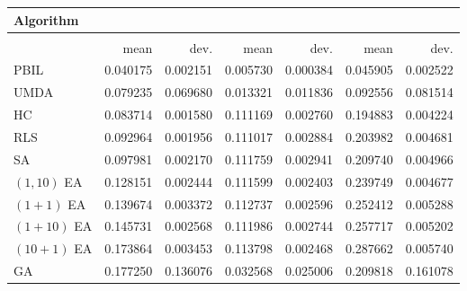 \begin{tabular}{@{} l *{6}{>{{}}N{1}{2}} @{}}
\toprule
{Algorithm} &  \\
\midrule
&  &  &  \\
\midrule
& {mean} & {dev.} & {mean} & {dev.} & {mean} & {dev.} \\
\midrule
PBIL & 0.040175 & 0.002151 & 0.005730 & 0.000384 & 0.045905 & 0.002522 \\
UMDA & 0.079235 & 0.069680 & 0.013321 & 0.011836 & 0.092556 & 0.081514 \\
HC & 0.083714 & 0.001580 & 0.111169 & 0.002760 & 0.194883 & 0.004224 \\
RLS & 0.092964 & 0.001956 & 0.111017 & 0.002884 & 0.203982 & 0.004681 \\
SA & 0.097981 & 0.002170 & 0.111759 & 0.002941 & 0.209740 & 0.004966 \\
$(1,10)$ EA & 0.128151 & 0.002444 & 0.111599 & 0.002403 & 0.239749 & 0.004677 \\
$(1+1)$ EA & 0.139674 & 0.003372 & 0.112737 & 0.002596 & 0.252412 & 0.005288 \\
$(1+10)$ EA & 0.145731 & 0.002568 & 0.111986 & 0.002744 & 0.257717 & 0.005202 \\
$(10+1)$ EA & 0.173864 & 0.003453 & 0.113798 & 0.002468 & 0.287662 & 0.005740 \\
GA & 0.177250 & 0.136076 & 0.032568 & 0.025006 & 0.209818 & 0.161078 \\
\bottomrule
\end{tabular}

